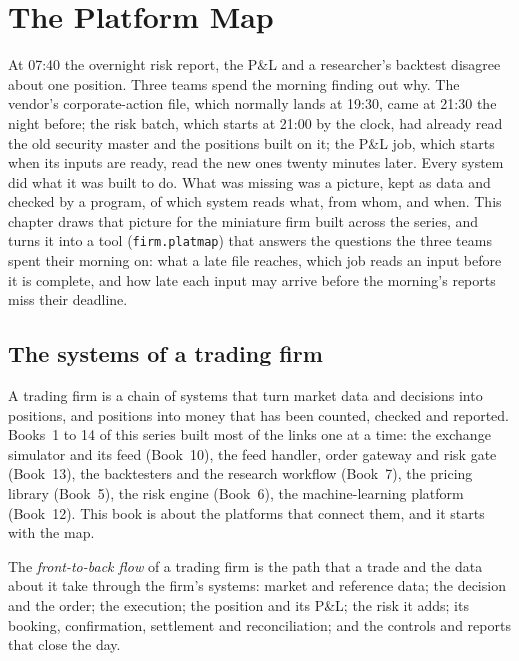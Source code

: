 \chapter{The Platform Map}\label{ch:pl:the-platform-map}

At 07:40 the overnight risk report, the P\&L and a researcher's backtest disagree about one position. Three teams spend the
morning finding out why. The vendor's corporate-action file, which normally lands at 19:30, came at 21:30 the night before; the
risk batch, which starts at 21:00 by the clock, had already read the old security master and the positions built on it; the P\&L
job, which starts when its inputs are ready, read the new ones twenty minutes later. Every system did what it was built to do.
What was missing was a picture, kept as data and checked by a program, of which system reads what, from whom, and when. This
chapter draws that picture for the miniature firm built across the series, and turns it into a tool (\texttt{firm.platmap})
that answers the questions the three teams spent their morning on: what a late file reaches, which job reads an input before it
is complete, and how late each input may arrive before the morning's reports miss their deadline.

\section{The systems of a trading firm}

A trading firm is a chain of systems that turn market data and decisions into positions, and positions into money that has
been counted, checked and reported. Books~1 to 14 of this series built most of the links one at a time: the exchange simulator
and its feed (Book~10), the feed handler, order gateway and risk gate (Book~13), the backtesters and the research workflow
(Book~7), the pricing library (Book~5), the risk engine (Book~6), the machine-learning platform (Book~12). This book is about
the platforms that connect them, and it starts with the map.

\begin{definition}\label{def:pl:the-platform-map:ftb}
The \emph{front-to-back flow} of a trading firm is the path that a trade and the data about it take
through the firm's systems: market and reference data; the decision and the order; the execution; the position and its P\&L;
the risk it adds; its booking, confirmation, settlement and reconciliation; and the controls and reports that close the day.
\end{definition}

